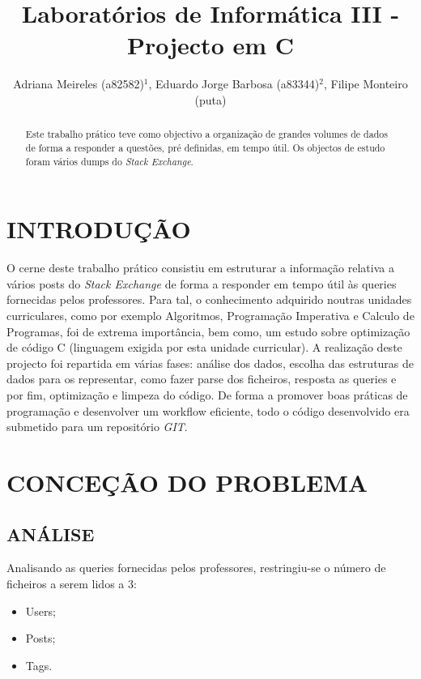 \documentclass[letterpaper, 10 pt, conference]{IEEEtran}  %
\title{\LARGE \bf
Laboratórios de Informática III - Projecto em C
}
\author{Adriana Meireles (a82582)$^{1}$, Eduardo Jorge Barbosa (a83344)$^{2}$, Filipe Monteiro (puta)%
}
\begin{document}
\maketitle
\thispagestyle{empty}
\pagestyle{empty}


\begin{abstract}

Este trabalho prático teve como objectivo a organização de grandes volumes de dados de forma a responder a questões, pré definidas, em tempo útil. Os objectos de estudo foram vários dumps do \textit{Stack Exchange}.

\end{abstract}


\section{INTRODUÇÃO}

O cerne deste trabalho prático consistiu em estruturar a informação relativa a vários posts do \textit{Stack Exchange} de forma a responder em tempo útil às queries fornecidas pelos professores. Para tal, o conhecimento adquirido noutras unidades curriculares, como por exemplo Algoritmos, Programação Imperativa e Calculo de Programas, foi de extrema importância, bem como, um estudo sobre optimização de código C (linguagem exigida por esta unidade curricular). A realização deste projecto foi repartida em várias fases: análise dos dados, escolha das estruturas de dados para os representar, como fazer parse dos ficheiros, resposta as queries e por fim, optimização e limpeza do código. De forma a promover boas práticas de programação e desenvolver um workflow eficiente, todo o código desenvolvido era submetido para um repositório \textit{GIT}.

\section{CONCEÇÃO DO PROBLEMA}

\subsection{ANÁLISE}

Analisando as queries fornecidas pelos professores, restringiu-se o número de ficheiros a serem lidos a 3:

\begin{itemize}
\item Users;
\item Posts;
\item Tags.
\end{itemize}
\end{document}
